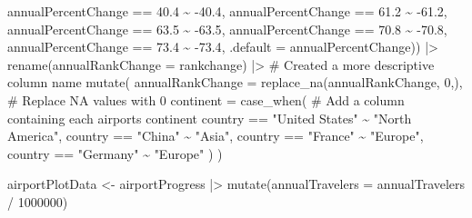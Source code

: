 \documentclass[
  letterpaper,
  DIV=11,
  numbers=noendperiod]{scrartcl}
\newenvironment{Shaded}{\begin{snugshade}}{\end{snugshade}}
\newcommand{\AttributeTok}[1]{\textcolor[rgb]{0.40,0.45,0.13}{#1}}
\newcommand{\CommentTok}[1]{\textcolor[rgb]{0.37,0.37,0.37}{#1}}
\newcommand{\DecValTok}[1]{\textcolor[rgb]{0.68,0.00,0.00}{#1}}
\newcommand{\FloatTok}[1]{\textcolor[rgb]{0.68,0.00,0.00}{#1}}
\newcommand{\FunctionTok}[1]{\textcolor[rgb]{0.28,0.35,0.67}{#1}}
\newcommand{\NormalTok}[1]{\textcolor[rgb]{0.00,0.23,0.31}{#1}}
\newcommand{\OtherTok}[1]{\textcolor[rgb]{0.00,0.23,0.31}{#1}}
\newcommand{\SpecialCharTok}[1]{\textcolor[rgb]{0.37,0.37,0.37}{#1}}
\newcommand{\StringTok}[1]{\textcolor[rgb]{0.13,0.47,0.30}{#1}}
\begin{document}
\begin{Shaded}
\begin{Highlighting}[]
\NormalTok{      annualPercentChange }\SpecialCharTok{==} \FloatTok{40.4} \SpecialCharTok{\textasciitilde{}} \SpecialCharTok{{-}}\FloatTok{40.4}\NormalTok{,}
\NormalTok{      annualPercentChange }\SpecialCharTok{==} \FloatTok{61.2} \SpecialCharTok{\textasciitilde{}} \SpecialCharTok{{-}}\FloatTok{61.2}\NormalTok{,}
\NormalTok{      annualPercentChange }\SpecialCharTok{==} \FloatTok{63.5} \SpecialCharTok{\textasciitilde{}} \SpecialCharTok{{-}}\FloatTok{63.5}\NormalTok{,}
\NormalTok{      annualPercentChange }\SpecialCharTok{==} \FloatTok{70.8} \SpecialCharTok{\textasciitilde{}} \SpecialCharTok{{-}}\FloatTok{70.8}\NormalTok{,}
\NormalTok{      annualPercentChange }\SpecialCharTok{==} \FloatTok{73.4} \SpecialCharTok{\textasciitilde{}} \SpecialCharTok{{-}}\FloatTok{73.4}\NormalTok{,}
      \AttributeTok{.default =}\NormalTok{ annualPercentChange)) }\SpecialCharTok{|\textgreater{}}
  \FunctionTok{rename}\NormalTok{(}\AttributeTok{annualRankChange =}\NormalTok{ rankchange) }\SpecialCharTok{|\textgreater{}} 
  \CommentTok{\# Created a more descriptive column name}
  \FunctionTok{mutate}\NormalTok{(}
    \AttributeTok{annualRankChange =} \FunctionTok{replace\_na}\NormalTok{(annualRankChange, }\DecValTok{0}\NormalTok{,), }\CommentTok{\# Replace NA values with 0}
    \AttributeTok{continent =} \FunctionTok{case\_when}\NormalTok{( }\CommentTok{\# Add a column containing each airport\textquotesingle{}s continent }
\NormalTok{      country }\SpecialCharTok{==} \StringTok{"United States"} \SpecialCharTok{\textasciitilde{}} \StringTok{"North America"}\NormalTok{,}
\NormalTok{      country }\SpecialCharTok{==} \StringTok{"China"} \SpecialCharTok{\textasciitilde{}} \StringTok{"Asia"}\NormalTok{,}
\NormalTok{      country }\SpecialCharTok{==} \StringTok{"France"} \SpecialCharTok{\textasciitilde{}} \StringTok{"Europe"}\NormalTok{,}
\NormalTok{      country }\SpecialCharTok{==} \StringTok{"Germany"} \SpecialCharTok{\textasciitilde{}} \StringTok{"Europe"}
\NormalTok{    )}
\NormalTok{  )}

\NormalTok{airportPlotData }\OtherTok{\textless{}{-}}\NormalTok{ airportProgress }\SpecialCharTok{|\textgreater{}}
  \FunctionTok{mutate}\NormalTok{(}\AttributeTok{annualTravelers =}\NormalTok{ annualTravelers }\SpecialCharTok{/} \DecValTok{1000000}\NormalTok{)}


\end{Highlighting}
\end{Shaded}
\end{document}
